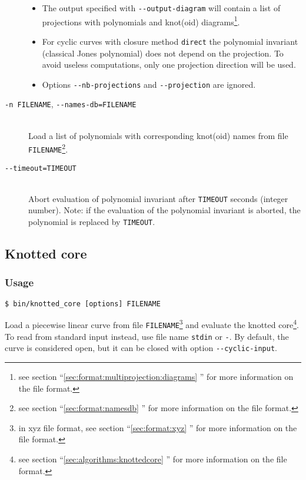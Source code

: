 \begin{description}
\begin{itemize}
    \item The output specified with \lstinline{--output-diagram} will contain a list of projections with polynomials and knot(oid) diagrams\footnote{see section ``\ref{sec:format:multiprojection:diagrams} '' for more information on the file format.}.
    \item For cyclic curves with closure method \lstinline{direct} the polynomial invariant (classical Jones polynomial) does not depend on the projection. To avoid useless computations, only one projection direction will be used.
    \item Options  \lstinline{--nb-projections} and \lstinline{--projection} are ignored.                                  
  \end{itemize}
\item[\lstinline{-n FILENAME}, \lstinline{--names-db=FILENAME}]\hfill\\
  Load a list of polynomials with corresponding knot(oid) names from file \lstinline{FILENAME}\footnote{see section ``\ref{sec:format:namesdb} '' for more information on the file format.}.
\item[\lstinline{--timeout=TIMEOUT}]\hfill\\
  Abort evaluation of polynomial invariant after \lstinline{TIMEOUT} seconds (integer number). Note: if the evaluation of the polynomial invariant is aborted, the polynomial is replaced by \lstinline{TIMEOUT}.
\end{description}


      
\subsection{Knotted core}
\subsubsection{Usage}
\begin{lstlisting}
$ bin/knotted_core [options] FILENAME
\end{lstlisting}

Load a piecewise linear curve from file  \lstinline{FILENAME}\footnote{in xyz file format, see section ``\ref{sec:format:xyz} ''  for more information on the file format.} and evaluate the knotted core\footnote{see section  ``\ref{sec:algorithms:knottedcore} '' for more information on the file format.}.
To read from standard input instead, use file name \lstinline{stdin} or \lstinline{-}.
By default, the curve is considered open, but it can be closed with option \lstinline{--cyclic-input}.

